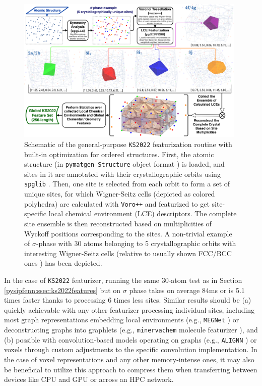 \begin{figure}[h]
    \centering
    \includegraphics[width=0.98\textwidth]{pysipfenn/KS2022.png}
    \caption{
    Schematic of the general-purpose \texttt{KS2022} featurization routine with built-in optimization for ordered structures. First, the atomic structure (in \texttt{pymatgen Structure} object format \cite{Ong2013PythonAnalysis}) is loaded, and sites in it are annotated with their crystallographic orbits using \texttt{spglib} \cite{Togo2018Spglib:Search}. Then, one site is selected from each orbit to form a set of unique sites, for which Wigner-Seitz cells (depicted as colored polyhedra) are calculated with \texttt{Voro++} \cite{Rycroft2007MultiscaleFlow, Rycroft2009Voro++:C++, Lu2023AnCells} and featurized to get site-specific local chemical environment (LCE) descriptors. The complete site ensemble is then reconstructed based on multiplicities of Wyckoff positions corresponding to the sites. A non-trivial example of $\sigma$-phase with 30 atoms belonging to 5 crystallographic orbits with interesting Wigner-Seitz cells (relative to usually shown FCC/BCC ones \cite{Bohm1996VoronoiLattices}) has been depicted.
    }
    \label{pysipfenn:fig:ks2022}
\end{figure}

In the case of \texttt{KS2022} featurizer, running the same 30-atom test as in Section \ref{pysipfenn:ssec:ks2022features} but on $\sigma$ phase takes on average $84$ms or is 5.1 times faster thanks to processing 6 times less sites. Similar results should be (a) quickly achievable with any other featurizer processing individual sites, including most graph representations embedding local environments (e.g., \texttt{MEGNet} \cite{Chen2019GraphCrystals}) or deconstructing graphs into graphlets (e.g., \texttt{minervachem} molecule featurizer \cite{Tynes2024LinearCheminformatics}), and (b) possible with convolution-based models operating on graphs (e.g., \texttt{ALIGNN} \cite{Choudhary2021AtomisticPredictions}) or voxels \cite{Davariashtiyani2023FormationRepresentation} through custom adjustments to the specific convolution implementation. In the case of voxel representations and any other memory-intense ones, it may also be beneficial to utilize this approach to compress them when transferring between devices like CPU and GPU or across an HPC network.



